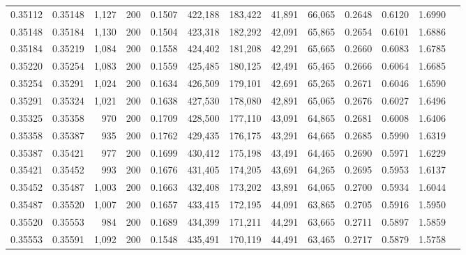 \begin{tabular}{rrrrrrrrrrrrr}
0.35112 & 0.35148 & 1,127 & 200 &                                     0.1507 & 422,188 & 183,422 &  41,891 &  66,065 & 0.2648 & 0.6120 & 1.6990 \\
0.35148 & 0.35184 & 1,130 & 200 &                                     0.1504 & 423,318 & 182,292 &  42,091 &  65,865 & 0.2654 & 0.6101 & 1.6886 \\
0.35184 & 0.35219 & 1,084 & 200 &                                     0.1558 & 424,402 & 181,208 &  42,291 &  65,665 & 0.2660 & 0.6083 & 1.6785 \\
0.35220 & 0.35254 & 1,083 & 200 &                                     0.1559 & 425,485 & 180,125 &  42,491 &  65,465 & 0.2666 & 0.6064 & 1.6685 \\
0.35254 & 0.35291 & 1,024 & 200 &                                     0.1634 & 426,509 & 179,101 &  42,691 &  65,265 & 0.2671 & 0.6046 & 1.6590 \\
0.35291 & 0.35324 & 1,021 & 200 &                                     0.1638 & 427,530 & 178,080 &  42,891 &  65,065 & 0.2676 & 0.6027 & 1.6496 \\
0.35325 & 0.35358 &   970 & 200 &                                     0.1709 & 428,500 & 177,110 &  43,091 &  64,865 & 0.2681 & 0.6008 & 1.6406 \\
0.35358 & 0.35387 &   935 & 200 &                                     0.1762 & 429,435 & 176,175 &  43,291 &  64,665 & 0.2685 & 0.5990 & 1.6319 \\
0.35387 & 0.35421 &   977 & 200 &                                     0.1699 & 430,412 & 175,198 &  43,491 &  64,465 & 0.2690 & 0.5971 & 1.6229 \\
0.35421 & 0.35452 &   993 & 200 &                                     0.1676 & 431,405 & 174,205 &  43,691 &  64,265 & 0.2695 & 0.5953 & 1.6137 \\
0.35452 & 0.35487 & 1,003 & 200 &                                     0.1663 & 432,408 & 173,202 &  43,891 &  64,065 & 0.2700 & 0.5934 & 1.6044 \\
0.35487 & 0.35520 & 1,007 & 200 &                                     0.1657 & 433,415 & 172,195 &  44,091 &  63,865 & 0.2705 & 0.5916 & 1.5950 \\
0.35520 & 0.35553 &   984 & 200 &                                     0.1689 & 434,399 & 171,211 &  44,291 &  63,665 & 0.2711 & 0.5897 & 1.5859 \\
0.35553 & 0.35591 & 1,092 & 200 &                                     0.1548 & 435,491 & 170,119 &  44,491 &  63,465 & 0.2717 & 0.5879 & 1.5758 \\

\end{tabular}

